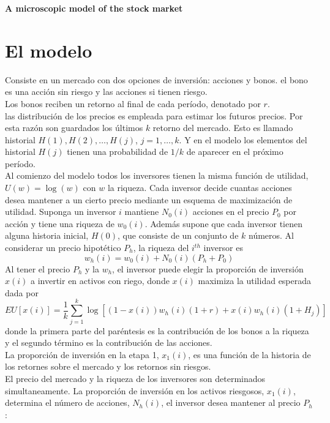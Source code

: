 \documentclass[12pt,a4paper]{article}
\begin{document}
\begin{center}
\textbf{A microscopic model of the stock market}\citep{Levy1994}
\end{center}
\section{El modelo}
\quad Consiste en un mercado con dos opciones de inversión: acciones  y bonos. el bono es una acción sin riesgo y las acciones si tienen riesgo.\\
\quad Los bonos reciben un retorno al final de cada período, denotado por $r$. \\
\quad las distribución de los precios es empleada para estimar los futuros precios. Por esta razón son guardados los últimos $k$ retorno del mercado. Esto es llamado historial $H(1),H(2),\dots ,H(j)$, $j = 1,\dots ,k$. Y en el modelo los elementos del historial $H(j)$ tienen una probabilidad de $1/k$ de aparecer en el próximo período.\\
\quad Al comienzo del modelo todos los inversores tienen la misma función de utilidad, $U(w)=\log(w)$ con $w$ la riqueza. Cada inversor decide cuantas acciones desea mantener a un cierto precio mediante un esquema de maximización de utilidad. Suponga un inversor $i$ mantiene $N_0(i)$ acciones en el precio $P_0$ por acción y tiene una riqueza de $w_0(i)$. Además supone que cada inversor tienen alguna historia inicial, $H(0)$, que consiste de un conjunto de $k$ números. Al considerar un precio hipotético $P_h$, la riqueza del $i^{th}$ inversor es
\begin{equation}
w_h(i) = w_0(i) + N_0(i)(P_h+P_0) 
\end{equation}
Al tener el precio $P_h$ y la $w_h$, el inversor puede elegir la proporción de inversión $x(i)$ a invertir en activos con riego, donde $x(i)$ maximiza la utilidad esperada dada por 
\begin{equation}
EU[x(i)] = \frac{1}{k} \sum^{k}_{j=1} \log[(1-x(i))w_h(i)(1+r)+x(i)w_h(i)(1+H_j)]
\end{equation}
donde la primera parte del paréntesis es la contribución de los bonos a la riqueza y el segundo término es la contribución de las acciones.\\
\quad La proporción de inversión en la etapa 1, $x_1(i)$, es una función de la historia de los retornes sobre el mercado y los retornos sin riesgos.\\
\quad El precio del mercado y la riqueza de los inversores son determinados simultaneamente. La proporción de inversión en los activos riesgosos, $x_1(i)$, determina el número de acciones, $N_h(i)$, el inversor desea mantener al precio $P_h$:
\end{document}
